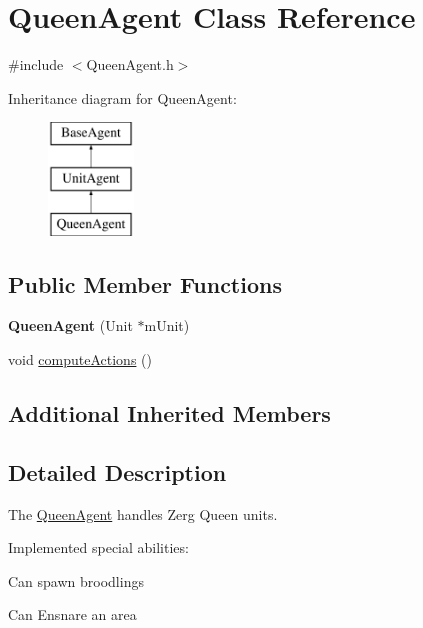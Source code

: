 \hypertarget{class_queen_agent}{\section{Queen\-Agent Class Reference}
\label{class_queen_agent}
}


{\ttfamily \#include $<$Queen\-Agent.\-h$>$}

Inheritance diagram for Queen\-Agent\-:\begin{figure}[H]
\begin{center}
\leavevmode
\includegraphics[height=3.000000cm]{class_queen_agent}
\end{center}
\end{figure}
\subsection*{Public Member Functions}
\begin{DoxyCompactItemize}
\item 
\hypertarget{class_queen_agent_a77e1eb93f800ae96ea07d5ab58fbe8a6}{{\bfseries Queen\-Agent} (Unit $\ast$m\-Unit)}\label{class_queen_agent_a77e1eb93f800ae96ea07d5ab58fbe8a6}

\item 
void \hyperlink{class_queen_agent_a600bf84cc4f4ed902daffaba83179e6e}{compute\-Actions} ()
\end{DoxyCompactItemize}
\subsection*{Additional Inherited Members}


\subsection{Detailed Description}
The \hyperlink{class_queen_agent}{Queen\-Agent} handles Zerg Queen units.

Implemented special abilities\-:
\begin{DoxyItemize}
\item Can spawn broodlings
\item Can Ensnare an area
\end{DoxyItemize}

